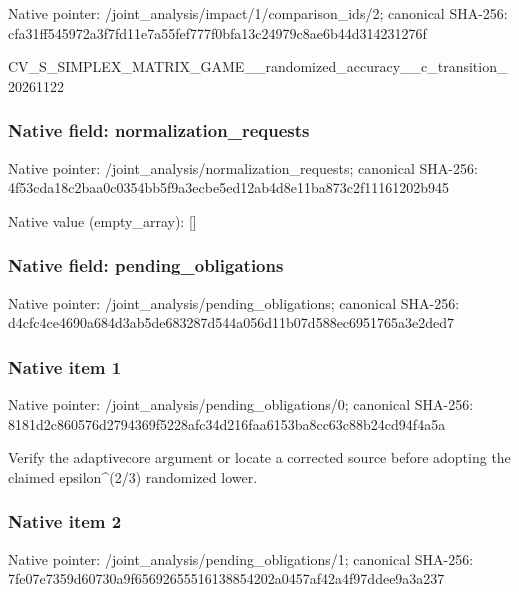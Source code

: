 \documentclass[10pt,a4paper]{article}
\begin{document}
Native pointer: /joint\_analysis/impact/1\allowbreak{}/comparison\_ids/2; canonical SHA-256: cfa31ff545972a3f7fd11e7a\allowbreak{}55fef777f0bfa13c24979c8a\allowbreak{}e6b44d314231276f


CV\_S\_SIMPLEX\_MATRIX\_GAME\allowbreak{}\_\_randomized\_accuracy\_\_c\allowbreak{}\_transition\_20261122


\subsubsection{Native field: normalization\_requests}


Native pointer: /joint\_analysis/normalization\_requests; canonical SHA-256: 4f53cda18c2baa0c0354bb5f\allowbreak{}9a3ecbe5ed12ab4d8e11ba87\allowbreak{}3c2f11161202b945



Native value (empty\_array): []



\subsubsection{Native field: pending\_obligations}


Native pointer: /joint\_analysis/pending\_obligations; canonical SHA-256: d4cfc4ce4690a684d3ab5de6\allowbreak{}83287d544a056d11b07d588e\allowbreak{}c6951765a3e2ded7



\subsubsection{Native item 1}


Native pointer: /joint\_analysis/pending\_obligations/0; canonical SHA-256: 8181d2c860576d2794369f52\allowbreak{}28afc34d216faa6153ba8cc6\allowbreak{}3c88b24cd94f4a5a


Verify the adaptivecore argument or locate a corrected source before adopting the claimed epsilon\textasciicircum{}(2/3) randomized lower.


\subsubsection{Native item 2}


Native pointer: /joint\_analysis/pending\_obligations/1; canonical SHA-256: 7fe07e7359d60730a9f65692\allowbreak{}655516138854202a0457af42\allowbreak{}a4f97ddee9a3a237
\end{document}
